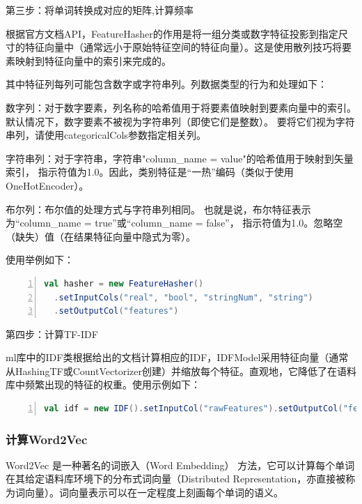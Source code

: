 \documentclass[lang=cn,11pt]{elegantpaper}
\begin{document}
第三步：将单词转换成对应的矩阵,计算频率

根据官方文档API，FeatureHasher的作用是将一组分类或数字特征投影到指定尺寸的特征向量中（通常远小于原始特征空间的特征向量）。这是使用散列技巧将要素映射到特征向量中的索引来完成的。

其中特征列每列可能包含数字或字符串列。列数据类型的行为和处理如下：

数字列：对于数字要素，列名称的哈希值用于将要素值映射到要素向量中的索引。
默认情况下，数字要素不被视为字符串列（即使它们是整数）。
要将它们视为字符串列，请使用categoricalCols参数指定相关列。

字符串列：对于字符串，字符串"column\_name = value"的哈希值用于映射到矢量索引，
指示符值为1.0。因此，类别特征是“一热”编码（类似于使用OneHotEncoder）。

布尔列：布尔值的处理方式与字符串列相同。
也就是说，布尔特征表示为“column\_name = true”或“column\_name = false”，
指示符值为1.0。忽略空（缺失）值（在结果特征向量中隐式为零）。

使用举例如下：
\begin{lstlisting}[language={Scala},numbers=left,numberstyle=\tiny,%frame=shadowbox,  
  rulesepcolor=\color{red!20!green!20!blue!20},  
  keywordstyle=\color{blue!70!black},  
  commentstyle=\color{blue!90!},  
  basicstyle=\ttfamily]  
val hasher = new FeatureHasher()
  .setInputCols("real", "bool", "stringNum", "string")
  .setOutputCol("features")
\end{lstlisting}\par

第四步：计算TF-IDF

ml库中的IDF类根据给出的文档计算相应的IDF，IDFModel采用特征向量（通常从HashingTF或CountVectorizer创建）并缩放每个特征。直观地，它降低了在语料库中频繁出现的特征的权重。使用示例如下：
\begin{lstlisting}[language={Scala},numbers=left,numberstyle=\tiny,%frame=shadowbox,  
  rulesepcolor=\color{red!20!green!20!blue!20},  
  keywordstyle=\color{blue!70!black},  
  commentstyle=\color{blue!90!},  
  basicstyle=\ttfamily]  
val idf = new IDF().setInputCol("rawFeatures").setOutputCol("features")
\end{lstlisting}\par

\subsubsection{计算Word2Vec}
Word2Vec 是一种著名的词嵌入（Word Embedding） 方法，它可以计算每个单词在其给定语料库环境下的分布式词向量（Distributed Representation，亦直接被称为词向量）。词向量表示可以在一定程度上刻画每个单词的语义。
\end{document}
